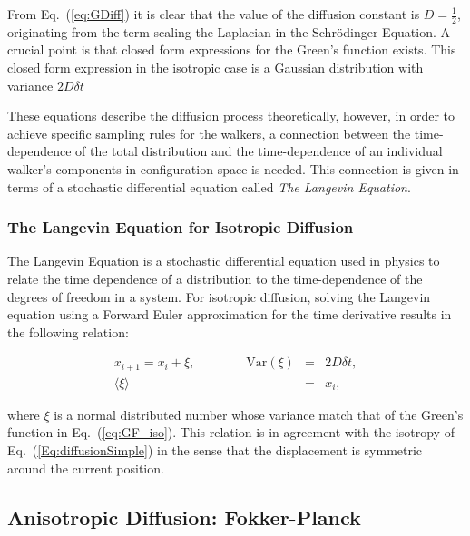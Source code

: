 From Eq.~(\ref{eq:GDiff}) it is clear that the value of the diffusion constant is $D=\frac{1}{2}$, originating from the term scaling the Laplacian in the Schrödinger Equation. A crucial point is that closed form expressions for the Green's function exists. This closed form expression in the isotropic case is a Gaussian distribution with variance $2D\delta t$ \cite{abInitioMC}


These equations describe the diffusion process theoretically, however, in order to achieve specific sampling rules for the walkers, a connection between the time-dependence of the total distribution and the time-dependence of an individual walker's components in configuration space is needed. This connection is given in terms of a stochastic differential equation called \textit{The Langevin Equation}.

\subsubsection{The Langevin Equation for Isotropic Diffusion}

The Langevin Equation is a stochastic differential equation used in physics to relate the time dependence of a distribution to the time-dependence of the degrees of freedom in a system. For isotropic diffusion, solving the Langevin equation using a Forward Euler approximation for the time derivative results in the following relation:

\begin{eqnarray}
\label{eq:langevinSolSimple}
 x_{i+1} = x_i + \xi, \qquad\qquad \mathrm{Var}(\xi) &=& 2D\delta t, \\
			     \langle\xi\rangle &=& x_i, \nonumber 
\end{eqnarray}

where $\xi$ is a normal distributed number whose variance match that of the Green's function in Eq.~(\ref{eq:GF_iso}). This relation is in agreement with the isotropy of Eq.~(\ref{Eq:diffusionSimple}) in the sense that the displacement is symmetric around the current position.


\subsection{Anisotropic Diffusion: Fokker-Planck}
\label{sec:anisFokker}

